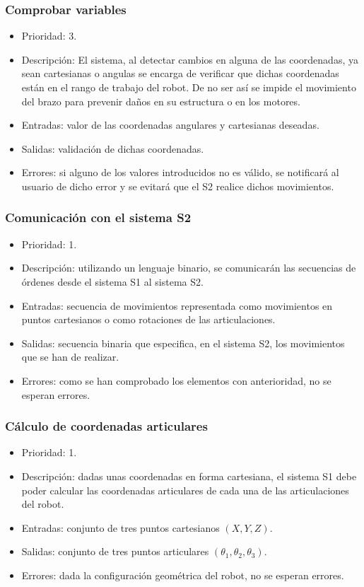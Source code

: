 \subsubsection{Comprobar variables}
\begin{itemize}
    \item Prioridad: 3.
    \item Descripción: El sistema, al detectar cambios en alguna de las coordenadas, ya sean cartesianas o angulas se encarga de verificar que dichas coordenadas están en el rango de trabajo del robot. De no ser así se impide el movimiento del brazo para prevenir daños en su estructura o en los motores.
    \item Entradas: valor de las coordenadas angulares y cartesianas deseadas.
    \item Salidas: validación de dichas coordenadas.
    \item Errores: si alguno de los valores introducidos no es válido, se notificará al usuario de dicho error y se evitará que el \ac{S2} realice dichos movimientos.
\end{itemize}

\subsubsection{Comunicación con el sistema \ac{S2}}
\begin{itemize}
    \item Prioridad: 1.
    \item Descripción: utilizando un lenguaje binario, se comunicarán las secuencias de órdenes desde el sistema \ac{S1} al sistema \ac{S2}.
    \item Entradas: secuencia de movimientos representada como movimientos en puntos cartesianos o como rotaciones de las articulaciones.
    \item Salidas: secuencia binaria que especifica, en el sistema \ac{S2}, los movimientos que se han de realizar.
    \item Errores: como se han comprobado los elementos con anterioridad, no se esperan errores.
\end{itemize}

\subsubsection{Cálculo de coordenadas articulares}
\begin{itemize}
    \item Prioridad: 1.
    \item Descripción: dadas unas coordenadas en forma cartesiana, el sistema \ac{S1} debe poder calcular las coordenadas articulares de cada una de las articulaciones del robot.
    \item Entradas: conjunto de tres puntos cartesianos $(X,Y,Z)$.
    \item Salidas: conjunto de tres puntos articulares $(\theta_1, \theta_2, \theta_3)$.
    \item Errores: dada la configuración geométrica del robot, no se esperan errores.
\end{itemize}

